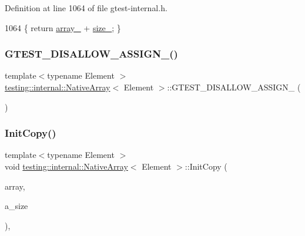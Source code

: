 Definition at line 1064 of file gtest-\/internal.\+h.


\begin{DoxyCode}
1064 \{ \textcolor{keywordflow}{return} \hyperlink{classtesting_1_1internal_1_1NativeArray_adadc025fbbbd43904d4036991019f18f}{array\_} + \hyperlink{classtesting_1_1internal_1_1NativeArray_aa7e4251de39aaa75f697f0eaeedbf06e}{size\_}; \}
\end{DoxyCode}
\mbox{\label{classtesting_1_1internal_1_1NativeArray_a6633f3eab6947d4502fb1c69f95be66e}} 
\subsubsection{\texorpdfstring{G\+T\+E\+S\+T\+\_\+\+D\+I\+S\+A\+L\+L\+O\+W\+\_\+\+A\+S\+S\+I\+G\+N\+\_\+()}{GTEST\_DISALLOW\_ASSIGN\_()}}
{\footnotesize\ttfamily template$<$typename Element $>$ \\
\hyperlink{classtesting_1_1internal_1_1NativeArray}{testing\+::internal\+::\+Native\+Array}$<$ Element $>$\+::G\+T\+E\+S\+T\+\_\+\+D\+I\+S\+A\+L\+L\+O\+W\+\_\+\+A\+S\+S\+I\+G\+N\+\_\+ (\begin{DoxyParamCaption}\item[{\hyperlink{classtesting_1_1internal_1_1NativeArray}{Native\+Array}$<$ Element $>$}]{ }\end{DoxyParamCaption})\hspace{0.3cm}{\ttfamily [private]}}

\mbox{\label{classtesting_1_1internal_1_1NativeArray_a8c0069cc09f559785fe4923fc118056f}} 
\subsubsection{\texorpdfstring{Init\+Copy()}{InitCopy()}}
{\footnotesize\ttfamily template$<$typename Element $>$ \\
void \hyperlink{classtesting_1_1internal_1_1NativeArray}{testing\+::internal\+::\+Native\+Array}$<$ Element $>$\+::Init\+Copy (\begin{DoxyParamCaption}\item[{const Element $\ast$}]{array,  }\item[{size\+\_\+t}]{a\+\_\+size }\end{DoxyParamCaption})\hspace{0.3cm}{\ttfamily [inline]}, {\ttfamily [private]}}




